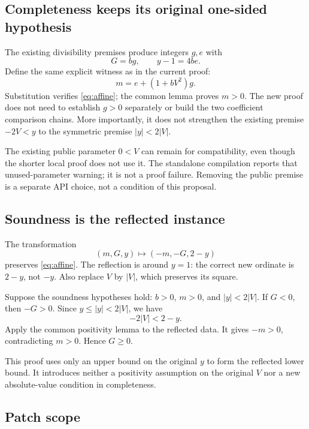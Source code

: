 \documentclass[11pt,letterpaper]{article}
\begin{document}
\subsection{Completeness keeps its original one-sided hypothesis}

The existing divisibility premises produce integers $g,e$ with
\[
 G=bg,\qquad y-1=4be.
\]
Define the same explicit witness as in the current proof:
\begin{equation}
 m=e+(1+bV^2)g.
 \label{eq:witness}
\end{equation}
Substitution verifies \eqref{eq:affine}; the common lemma proves $m>0$. The new proof does not need to establish $g>0$ separately or build the two coefficient comparison chains. More importantly, it does not strengthen the existing premise $-2V<y$ to the symmetric premise $|y|<2|V|$.

The existing public parameter $0<V$ can remain for compatibility, even though the shorter local proof does not use it. The standalone compilation reports that unused-parameter warning; it is not a proof failure. Removing the public premise is a separate API choice, not a condition of this proposal.

\subsection{Soundness is the reflected instance}

The transformation
\begin{equation}
 (m,G,y)\longmapsto(-m,-G,2-y)
 \label{eq:reflect}
\end{equation}
preserves \eqref{eq:affine}. The reflection is around $y=1$: the correct new ordinate is $2-y$, not $-y$. Also replace $V$ by $|V|$, which preserves its square.

Suppose the soundness hypotheses hold: $b>0$, $m>0$, and $|y|<2|V|$. If $G<0$, then $-G>0$. Since $y\le |y|<2|V|$, we have
\[
 -2|V|<2-y.
\]
Apply the common positivity lemma to the reflected data. It gives $-m>0$, contradicting $m>0$. Hence $G\ge0$.

This proof uses only an upper bound on the original $y$ to form the reflected lower bound. It introduces neither a positivity assumption on the original $V$ nor a new absolute-value condition in completeness.

\subsection{Patch scope}
\end{document}
